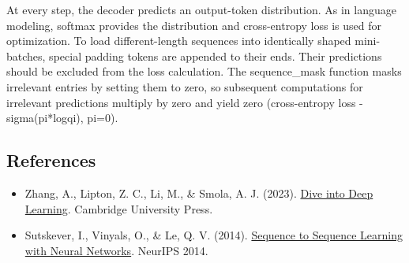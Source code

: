 At every step, the decoder predicts an output-token distribution. As in language modeling, softmax provides the distribution and cross-entropy loss is used for optimization. To load different-length sequences into identically shaped mini-batches, special padding tokens are appended to their ends. Their predictions should be excluded from the loss calculation. The sequence\_mask function masks irrelevant entries by setting them to zero, so subsequent computations for irrelevant predictions multiply by zero and yield zero (cross-entropy loss -sigma(pi*logqi), pi=0).

\FloatBarrier
{}
\hypertarget{references-24}{%
\subsection{References}\label{references-24}}

\vspace{0.25em}
\begin{itemize}
\tightlist
\item
  Zhang, A., Lipton, Z. C., Li, M., \& Smola, A. J. (2023). \href{https://D2L.ai}{Dive into Deep Learning}. Cambridge University Press.
\item
  Sutskever, I., Vinyals, O., \& Le, Q. V. (2014). \href{https://proceedings.neurips.cc/paper_files/paper/2014/hash/5a18e133cbf9f257297f410bb7eca942-Abstract.html}{Sequence to Sequence Learning with Neural Networks}. NeurIPS 2014.
\end{itemize}

\clearpage
